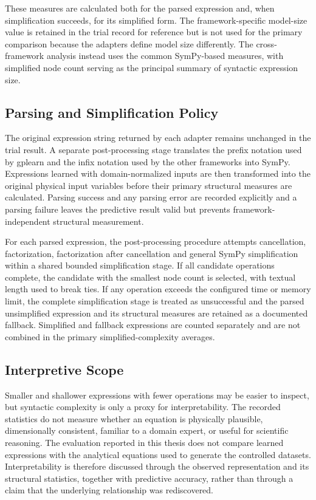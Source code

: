 \documentclass[12pt,oneside,bibtotoc,liststotoc]{scrbook}
\begin{document}
These measures are calculated both for the parsed expression and, when simplification succeeds, for its simplified form. The framework-specific model-size value is retained in the trial record for reference but is not used for the primary comparison because the adapters define model size differently. The cross-framework analysis instead uses the common SymPy-based measures, with simplified node count serving as the principal summary of syntactic expression size.

\subsection{Parsing and Simplification Policy}

The original expression string returned by each adapter remains unchanged in the trial result. A separate post-processing stage translates the prefix notation used by gplearn and the infix notation used by the other frameworks into SymPy. Expressions learned with domain-normalized inputs are then transformed into the original physical input variables before their primary structural measures are calculated. Parsing success and any parsing error are recorded explicitly and a parsing failure leaves the predictive result valid but prevents framework-independent structural measurement.

For each parsed expression, the post-processing procedure attempts cancellation, factorization, factorization after cancellation and general SymPy simplification within a shared bounded simplification stage. If all candidate operations complete, the candidate with the smallest node count is selected, with textual length used to break ties. If any operation exceeds the configured time or memory limit, the complete simplification stage is treated as unsuccessful and the parsed unsimplified expression and its structural measures are retained as a documented fallback. Simplified and fallback expressions are counted separately and are not combined in the primary simplified-complexity averages.

\subsection{Interpretive Scope}

Smaller and shallower expressions with fewer operations may be easier to inspect, but syntactic complexity is only a proxy for interpretability. The recorded statistics do not measure whether an equation is physically plausible, dimensionally consistent, familiar to a domain expert, or useful for scientific reasoning. The evaluation reported in this thesis does not compare learned expressions with the analytical equations used to generate the controlled datasets. Interpretability is therefore discussed through the observed representation and its structural statistics, together with predictive accuracy, rather than through a claim that the underlying relationship was rediscovered.
\end{document}
